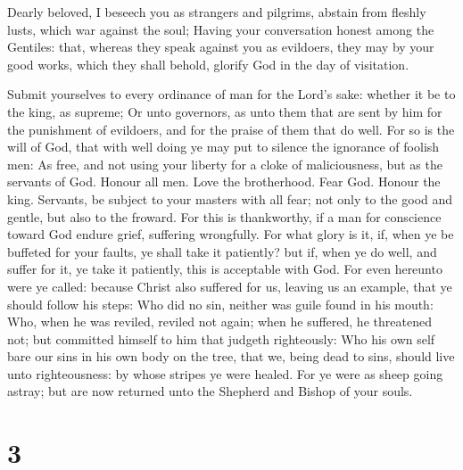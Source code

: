  Dearly beloved, I beseech you as strangers and pilgrims,
abstain from fleshly lusts, which war against the soul; 
Having your conversation honest among the Gentiles: that, whereas they
speak against you as evildoers, they may by your good works, which they
shall behold, glorify God in the day of visitation.

 Submit yourselves to every ordinance of man for the
Lord's sake: whether it be to the king, as supreme;  Or
unto governors, as unto them that are sent by him for the punishment of
evildoers, and for the praise of them that do well.  For
so is the will of God, that with well doing ye may put to silence the
ignorance of foolish men:  As free, and not using your
liberty for a cloke of maliciousness, but as the servants of God.
 Honour all men. Love the brotherhood. Fear God. Honour
the king.  Servants, be subject to your masters with all
fear; not only to the good and gentle, but also to the froward.
 For this is thankworthy, if a man for conscience toward
God endure grief, suffering wrongfully.  For what glory
is it, if, when ye be buffeted for your faults, ye shall take it
patiently? but if, when ye do well, and suffer for it, ye take it
patiently, this is acceptable with God.  For even
hereunto were ye called: because Christ also suffered for us, leaving us
an example, that ye should follow his steps:  Who did no
sin, neither was guile found in his mouth:  Who, when he
was reviled, reviled not again; when he suffered, he threatened not; but
committed himself to him that judgeth righteously:  Who
his own self bare our sins in his own body on the tree, that we, being
dead to sins, should live unto righteousness: by whose stripes ye were
healed.  For ye were as sheep going astray; but are now
returned unto the Shepherd and Bishop of your souls.

\hypertarget{section-2}{%
\section{3}\label{section-2}}


